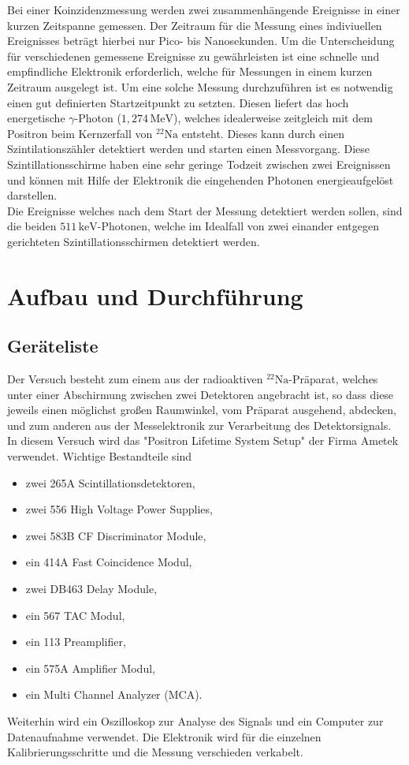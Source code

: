 \documentclass[numbers=noenddot,12pt,a4paper]{scrartcl}
\begin{document}
			Bei einer Koinzidenzmessung werden zwei zusammenhängende Ereignisse in einer kurzen Zeitspanne gemessen. Der Zeitraum für die Messung eines indiviuellen Ereignisses beträgt hierbei nur Pico- bis Nanosekunden. Um die Unterscheidung für verschiedenen gemessene Ereignisse zu gewährleisten ist eine schnelle und empfindliche Elektronik erforderlich, welche für Messungen in einem kurzen Zeitraum ausgelegt ist. Um eine solche Messung durchzuführen ist es notwendig einen gut definierten Startzeitpunkt zu setzten. Diesen liefert das hoch energetische $\gamma$-Photon ($1,274\,\mathrm{MeV}$), welches idealerweise zeitgleich mit dem Positron beim Kernzerfall von ${}^{22}\mathrm{Na}$ entsteht. Dieses kann durch einen Szintilationszähler detektiert werden und starten einen Messvorgang. Diese Szintillationsschirme haben eine sehr geringe Todzeit zwischen zwei Ereignissen und können mit Hilfe der Elektronik die eingehenden Photonen energieaufgelöst darstellen.\\
			Die Ereignisse welches nach dem Start der Messung detektiert werden sollen, sind die beiden $511\,\mathrm{keV}$-Photonen, welche im Idealfall von zwei einander entgegen gerichteten Szintillationsschirmen detektiert werden. 
			
\newpage

\section{Aufbau und Durchführung}

	\subsection{Geräteliste}
		
		Der Versuch besteht zum einem aus der radioaktiven ${}^22\mathrm{Na}$-Präparat, welches unter einer Abschirmung zwischen zwei Detektoren angebracht ist, so dass diese jeweils einen möglichst großen Raumwinkel, vom Präparat ausgehend, abdecken, und zum anderen aus der Messelektronik zur Verarbeitung des Detektorsignals. In diesem Versuch wird das {}"Positron Lifetime System Setup{}" der Firma Ametek verwendet. Wichtige Bestandteile sind
		\begin{itemize}
			\item zwei 265A Scintillationsdetektoren,
			\item zwei 556 High Voltage Power Supplies,
			\item zwei 583B CF Discriminator Module,
			\item ein 414A Fast Coincidence Modul,
			\item zwei DB463 Delay Module,
			\item ein 567 TAC Modul,
			\item ein 113 Preamplifier,
			\item ein 575A Amplifier Modul,
			\item ein Multi Channel Analyzer (MCA).
		\end{itemize}
		Weiterhin wird ein Oszilloskop zur Analyse des Signals und ein Computer zur Datenaufnahme verwendet. Die Elektronik wird für die einzelnen Kalibrierungsschritte und die Messung verschieden verkabelt.
		
\end{document}
